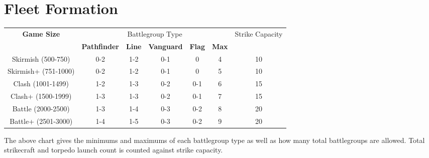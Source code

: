 \chapter{Fleet Formation}

\begin{center}
	\begin{tabular}{|c|c|c|c|c|c|c|}
		\hline
		\multirow{2}{*}{\textbf{Game Size}} & \multicolumn{5}{c}{Battlegroup Type} & \multirow{2}{*}{Strike Capacity} \\
		& \textbf{Pathfinder} & \textbf{Line} & \textbf{Vanguard} & \textbf{Flag} & \textbf{Max} & \\
		\hline
		Skirmish (500-750) & 0-2 & 1-2 & 0-1 & 0 & 4 & 10 \\
		\hline
		\gray Skirmish+ (751-1000) & 0-2 & 1-2 & 0-1 & 0 & 5 & 10 \\
		\hline
		Clash (1001-1499) & 1-2 & 1-3 & 0-2 & 0-1 & 6 & 15 \\
		\hline
		\gray Clash+ (1500-1999) & 1-3 & 1-3 & 0-2 & 0-1 & 7 & 15 \\
		\hline
		Battle (2000-2500) & 1-3 & 1-4 & 0-3 & 0-2 & 8 & 20 \\
		\hline
		\gray Battle+ (2501-3000) & 1-4 & 1-5 & 0-3 & 0-2 & 9 & 20 \\
		\hline
	\end{tabular}
	
\end{center}

The above chart gives the minimums and maximums of each battlegroup type as well as how many total battlegroups are allowed. Total strikecraft and torpedo launch count is counted against strike capacity.

